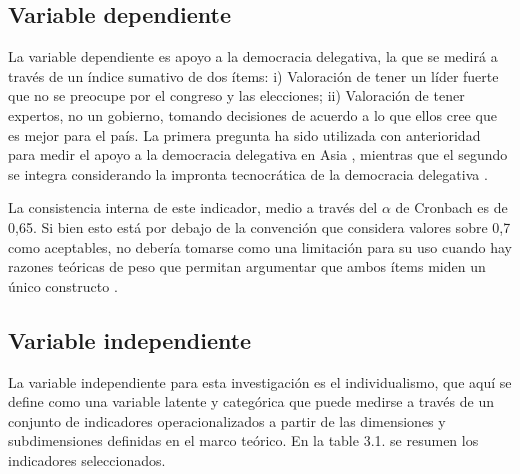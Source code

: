 \documentclass[12pt,twoside]{templates/facsothesis}
\begin{document}
\hypertarget{variable-dependiente}{%
\subsection{Variable dependiente}\label{variable-dependiente}}

La variable dependiente es apoyo a la democracia delegativa, la que se medirá a través de un índice sumativo de dos ítems: i) Valoración de tener un líder fuerte que no se preocupe por el congreso y las elecciones; ii) Valoración de tener expertos, no un gobierno, tomando decisiones de acuerdo a lo que ellos cree que es mejor para el país. La primera pregunta ha sido utilizada con anterioridad para medir el apoyo a la democracia delegativa en Asia \citep{kang2018a}, mientras que el segundo se integra considerando la impronta tecnocrática de la democracia delegativa \citep{odonnell1994}.

La consistencia interna de este indicador, medio a través del \(\alpha\) de Cronbach es de 0,65. Si bien esto está por debajo de la convención que considera valores sobre 0,7 como aceptables, no debería tomarse como una limitación para su uso cuando hay razones teóricas de peso que permitan argumentar que ambos ítems miden un único constructo \citep{schmitt1996}.

\hypertarget{variable-independiente}{%
\subsection{Variable independiente}\label{variable-independiente}}

La variable independiente para esta investigación es el individualismo, que aquí se define como una variable latente y categórica que puede medirse a través de un conjunto de indicadores operacionalizados a partir de las dimensiones y subdimensiones definidas en el marco teórico. En la table 3.1. se resumen los indicadores seleccionados.
\end{document}
